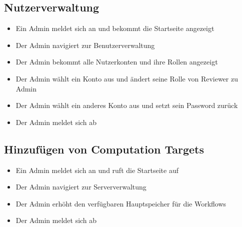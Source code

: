 \subsection*{Nutzerverwaltung}
\begin{itemize}
    \item Ein \Gls{Admin} meldet sich an und bekommt die Startseite angezeigt
    \item Der \Gls{Admin} navigiert zur Benutzerverwaltung
    \item Der \Gls{Admin} bekommt alle Nutzerkonten und ihre Rollen angezeigt
    \item Der \Gls{Admin} wählt ein Konto aus und ändert seine Rolle von \Gls{Reviewer} zu \Gls{Admin}
    \item Der \Gls{Admin} wählt ein anderes Konto aus und setzt sein Password zurück
    \item Der \Gls{Admin} meldet sich ab
\end{itemize}


\subsection*{Hinzufügen von Computation Targets}
\begin{itemize}
    \item Ein \Gls{Admin} meldet sich an und ruft die Startseite auf
    \item Der \Gls{Admin} navigiert zur Serververwaltung
    \item Der \gls{Admin} erhöht den verfügbaren Hauptspeicher für die Workflows
    \item Der \gls{Admin} meldet sich ab
\end{itemize}
